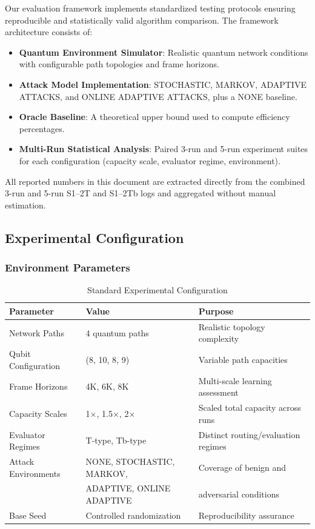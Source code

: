 \documentclass[12pt,a4paper]{article}
\begin{document}
Our evaluation framework implements standardized testing protocols ensuring reproducible and statistically valid algorithm comparison. The framework architecture consists of:

\begin{itemize}
\item \textbf{Quantum Environment Simulator}: Realistic quantum network conditions with configurable path topologies and frame horizons.
\item \textbf{Attack Model Implementation}: STOCHASTIC, MARKOV, ADAPTIVE ATTACKS, and ONLINE ADAPTIVE ATTACKS, plus a NONE baseline.
\item \textbf{Oracle Baseline}: A theoretical upper bound used to compute efficiency percentages.
\item \textbf{Multi-Run Statistical Analysis}: Paired 3-run and 5-run experiment suites for each configuration (capacity scale, evaluator regime, environment).
\end{itemize}

All reported numbers in this document are extracted directly from the combined 3-run and 5-run S1–2T and S1–2Tb logs and aggregated without manual estimation.

\subsection{Experimental Configuration}

\subsubsection{Environment Parameters}

\begin{table}[H]
\centering
\caption{Standard Experimental Configuration}
\begin{tabular}{|l|l|l|}
\hline
\textbf{Parameter} & \textbf{Value} & \textbf{Purpose} \\
\hline
\hline
Network Paths & 4 quantum paths & Realistic topology complexity \\
Qubit Configuration & (8, 10, 8, 9) & Variable path capacities \\
Frame Horizons & 4K, 6K, 8K & Multi-scale learning assessment \\
Capacity Scales & 1$\times$, 1.5$\times$, 2$\times$ & Scaled total capacity across runs \\
Evaluator Regimes & T-type, Tb-type & Distinct routing/evaluation regimes \\
Attack Environments & NONE, STOCHASTIC, MARKOV, & Coverage of benign and \\
 & ADAPTIVE, ONLINE ADAPTIVE & adversarial conditions \\
Base Seed & Controlled randomization & Reproducibility assurance \\
\hline
\end{tabular}
\end{table}
\end{document}
